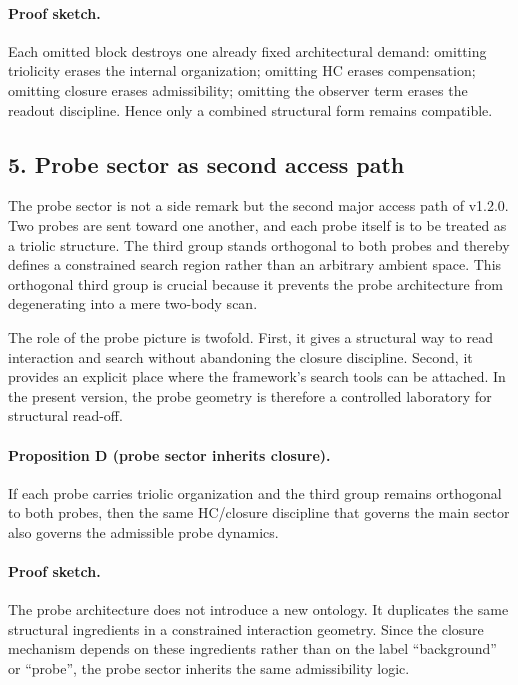 \paragraph{Proof sketch.}
Each omitted block destroys one already fixed architectural demand: omitting
triolicity erases the internal organization; omitting HC erases compensation;
omitting closure erases admissibility; omitting the observer term erases the
readout discipline. Hence only a combined structural form remains compatible.

\subsection*{5. Probe sector as second access path}
The probe sector is not a side remark but the second major access path of
v1.2.0. Two probes are sent toward one another, and each probe itself is
to be treated as a triolic structure. The third group stands orthogonal to both
probes and thereby defines a constrained search region rather than an arbitrary
ambient space. This orthogonal third group is crucial because it prevents the
probe architecture from degenerating into a mere two-body scan.

The role of the probe picture is twofold. First, it gives a structural way to
read interaction and search without abandoning the closure discipline. Second,
it provides an explicit place where the framework's search tools can be
attached. In the present version, the probe geometry is therefore a controlled
laboratory for structural read-off.

\paragraph{Proposition D (probe sector inherits closure).}
If each probe carries triolic organization and the third group remains
orthogonal to both probes, then the same HC/closure discipline that governs the
main sector also governs the admissible probe dynamics.

\paragraph{Proof sketch.}
The probe architecture does not introduce a new ontology. It duplicates the
same structural ingredients in a constrained interaction geometry. Since the
closure mechanism depends on these ingredients rather than on the label
``background'' or ``probe'', the probe sector inherits the same admissibility
logic.

